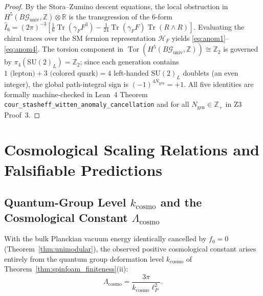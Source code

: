 \documentclass[11pt,a4paper]{article}
\theoremstyle{plain}
\theoremstyle{definition}
\theoremstyle{remark}
\newcommand{\Tr}{\operatorname{Tr}}
\newcommand{\SU}{\mathrm{SU}}
\newcommand{\Hilb}{\mathcal{H}}
\newcommand{\R}{\mathbb{R}}
\newcommand{\Z}{\mathbb{Z}}
\begin{document}
\begin{proof}
By the Stora--Zumino descent equations, the local obstruction in $H^5(B\mathcal{G}_{\mathrm{univ}}, \Z) \otimes \R$ is the transgression of the 6-form $\hat{I}_6 = (2\pi)^{-3}[\frac{1}{6}\Tr(\gamma_F F^3) - \frac{1}{24}\Tr(\gamma_F F)\Tr(R\wedge R)]$. Evaluating the chiral traces over the SM fermion representation $\Hilb_F$ yields \eqref{eq:anom1}--\eqref{eq:anom4}. The torsion component in $\operatorname{Tor}(H^5(B\mathcal{G}_{\mathrm{univ}},\Z)) \cong \Z_2$ is governed by $\pi_4(\SU(2)_L) = \Z_2$; since each generation contains $1\text{ (lepton)} + 3\text{ (colored quark)} = 4$ left-handed $\SU(2)_L$ doublets (an even integer), the global path-integral sign is $(-1)^{4 N_{\mathrm{gen}}} = +1$. All five identities are formally machine-checked in Lean~4 Theorem \texttt{cour\_stasheff\_witten\_anomaly\_cancellation} and for all $N_{\mathrm{gen}} \in \Z_+$ in Z3 Proof~3.
\end{proof}

\section{Cosmological Scaling Relations and Falsifiable Predictions}
\label{sec:cosmology}

\subsection{Quantum-Group Level $k_{\mathrm{cosmo}}$ and the Cosmological Constant $\Lambda_{\mathrm{cosmo}}$}

With the bulk Planckian vacuum energy identically cancelled by $f_0 = 0$ (Theorem~\ref{thm:unimodular}), the observed positive cosmological constant arises entirely from the quantum group deformation level $k_{\mathrm{cosmo}}$ of Theorem~\ref{thm:spinfoam_finiteness}(ii):
\begin{equation}
  \label{eq:lambda_k}
  \Lambda_{\mathrm{cosmo}} = \frac{3\pi}{k_{\mathrm{cosmo}} \ell_P^2}.
\end{equation}
\end{document}
